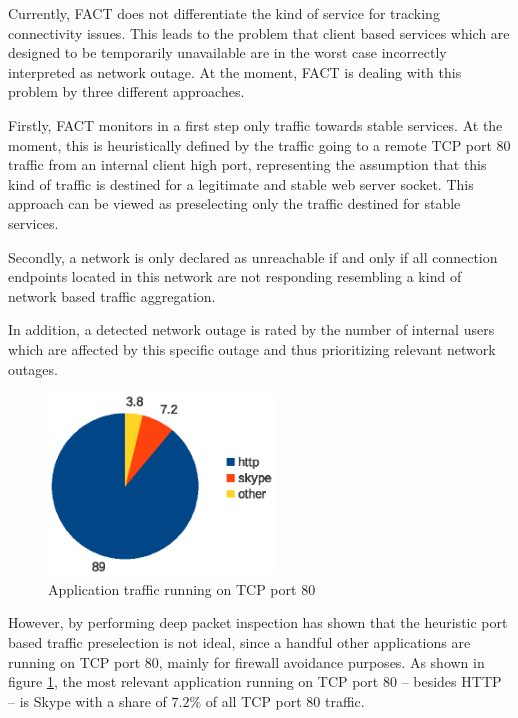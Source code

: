 Currently, \gls{FACT} does not differentiate the kind of service for tracking 
connectivity issues. This leads to the problem that client based services which 
are designed to be temporarily unavailable are in the worst case incorrectly 
interpreted as network outage. 
At the moment, \gls{FACT} is dealing with this problem by three different 
approaches. 

Firstly, \gls{FACT} monitors in a first step only traffic towards stable 
services. At the moment, this is heuristically defined by the traffic going to a 
remote \gls{TCP} port 80 traffic from an internal client high port, representing 
the assumption that this kind of traffic is destined for a legitimate and stable 
web server socket. This approach can be viewed as preselecting only the traffic 
destined for stable services.  

Secondly, a network is only declared as unreachable if and only if all 
connection endpoints located in this network are not responding resembling a 
kind of network based traffic aggregation. 

In addition, a detected network outage is rated by the number of internal users 
which are affected by this specific outage and thus prioritizing relevant 
network outages.

\begin{figure}
	[ht] \centering
	\includegraphics[width=6cm]{images/application_fact_port_80.eps}
	\caption{Application traffic running on TCP port 80 \citep{SchatzmanThesis2012}} 
	\label{fig:tcp_port80}
\end{figure}

However, by performing deep packet inspection \citet{SchatzmanThesis2012} has 
shown that the heuristic port based traffic preselection is not ideal, since a 
handful other applications are running on \gls{TCP}  port 80, mainly for 
firewall avoidance purposes. As shown in figure \ref{fig:tcp_port80}, the most 
relevant application running on \gls{TCP} port 80 -- besides \gls{HTTP} --
is Skype with a share of $7.2\%$ of all \gls{TCP} port 80 traffic. 

